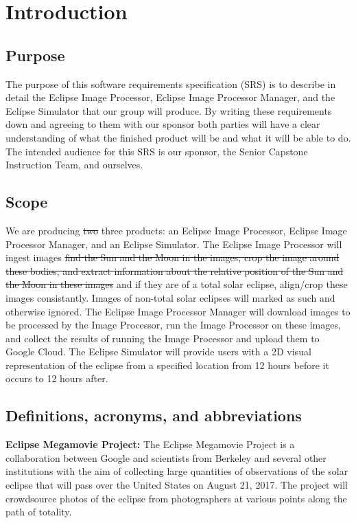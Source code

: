 \documentclass[10pt, onecolumn, draftclsnofoot, letterpaper, compsoc]{IEEEtran}
\begin{document}
\section{Introduction}

\subsection{Purpose}
The purpose of this software requirements specification (SRS) is to describe in
detail the Eclipse Image Processor, Eclipse Image Processor Manager, and the Eclipse 
Simulator that our group will 
produce. By writing these requirements down and agreeing to them with our 
sponsor both parties will have a clear understanding of what the finished 
product will be and what it will be able to do. The intended audience for this 
SRS is our sponsor, the Senior Capstone Instruction Team, and ourselves.

\subsection{Scope}
We are producing \sout{two} three products: an Eclipse Image Processor, Eclipse 
Image Processor Manager, and an Eclipse 
Simulator. The Eclipse Image Processor will ingest images \sout{find the Sun and the
Moon in the images, crop the image around these bodies, and extract information 
about the relative position of the Sun and the Moon in these images} and if
they are of a total solar eclipse, align/crop these images consistantly. Images of non-total
solar eclipses will marked as such and otherwise ignored. The Eclipse Image Processor Manager
will download images to be processed by the Image Processor, run the Image Processor on these images,
and collect the results of running the Image Processor and upload them to Google Cloud. The Eclipse 
Simulator will provide users with a 2D visual representation of the eclipse from a 
specified location from 12 hours before it occurs to 12 hours after.

\subsection{Definitions, acronyms, and abbreviations}
	
	\textbf{Eclipse Megamovie Project:}
	The Eclipse Megamovie Project is a collaboration between Google 
	and scientists from Berkeley and several other institutions with the 
	aim of collecting large quantities of observations of the solar eclipse
	that will pass over the United States on August 21, 2017. The project
	will crowdsource photos of the eclipse from photographers at various 
	points along the path of totality. \\
\end{document}
